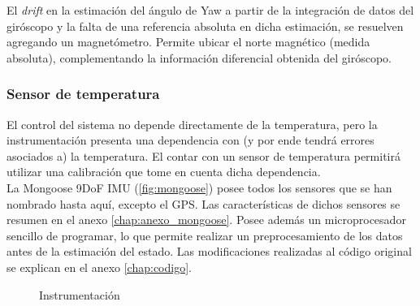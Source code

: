 \documentclass[main]{subfiles}
\begin{document}
El \textit{drift} en la estimaci\'on del \'angulo de Yaw a partir de la integraci\'on de datos del gir\'oscopo y la falta de una referencia absoluta en dicha estimaci\'on, se resuelven agregando un magnet\'ometro. Permite ubicar el norte magn\'etico (medida absoluta), complementando la informaci\'on diferencial obtenida del gir\'oscopo.

\subsubsection{Sensor de temperatura}

El control del sistema no depende directamente de la temperatura, pero la instrumentaci\'on presenta una dependencia con (y por ende tendr\'a errores asociados a) la temperatura. El contar con un sensor de temperatura permitir\'a utilizar una calibraci\'on que tome en cuenta dicha dependencia.\\

La Mongoose 9DoF IMU (\ref{fig:mongoose}) posee todos los sensores que se han nombrado hasta aqu\'i, excepto el GPS. Las caracter\'isticas de dichos sensores se resumen en el anexo \ref{chap:anexo_mongoose}. Posee adem\'as un microprocesador sencillo de programar, lo que permite realizar un preprocesamiento de los datos antes de la estimaci\'on del estado. Las modificaciones realizadas al c\'odigo original se explican en el anexo \ref{chap:codigo}.

\begin{figure} 
  \vspace{-40pt}
  \centering
  \hspace{2cm}
  
  \caption{Instrumentaci\'on}
  \label{fig:intrumentacion}
\end{figure}
\end{document}
